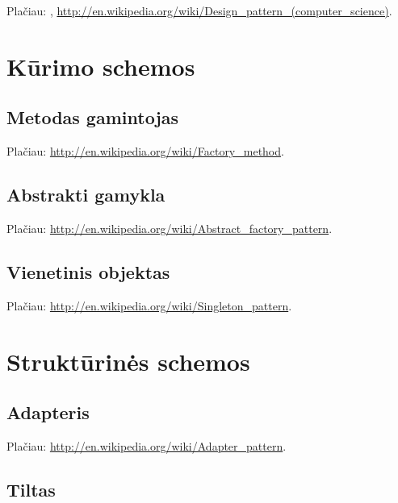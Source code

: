
Plačiau: \cite{gamma1995design}, \cite{martin2003agile}
\url{http://en.wikipedia.org/wiki/Design\_pattern\_(computer\_science)}.

\section{Kūrimo schemos}


\subsection{Metodas gamintojas}


Plačiau: \url{http://en.wikipedia.org/wiki/Factory\_method}.

\subsection{Abstrakti gamykla}


Plačiau: \url{http://en.wikipedia.org/wiki/Abstract\_factory\_pattern}.

\subsection{Vienetinis objektas}


Plačiau: \url{http://en.wikipedia.org/wiki/Singleton\_pattern}.

\section{Struktūrinės schemos}


\subsection{Adapteris}


Plačiau: \url{http://en.wikipedia.org/wiki/Adapter_pattern}.

\subsection{Tiltas}

